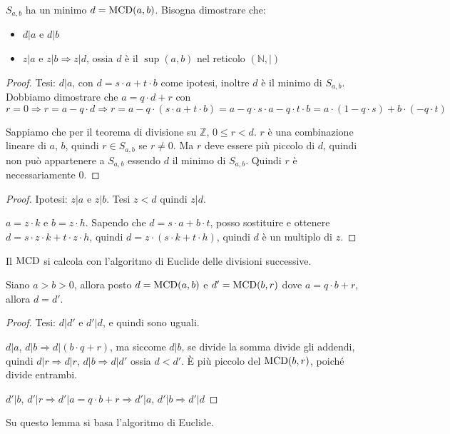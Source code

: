 $S_{a,b}$ ha un minimo $d = \operatorname{MCD}(a,b)$. Bisogna dimostrare che:
\begin{itemize}
    \item $d | a$ e $d | b$
    \item $z | a$ e $z | b \Rightarrow z | d$, ossia $d$ \`e il $\sup(a,b)$ nel reticolo $(\mathbb{N}, |)$
\end{itemize}
\begin{proof}
Tesi: $d | a$, con $d = s \cdot a + t \cdot b$ come ipotesi, inoltre $d$ \`e il minimo di $S_{a,b}$. Dobbiamo dimostrare che $a = q \cdot d + r$ con $r = 0 \Rightarrow r = a - q \cdot d \Rightarrow r = a - q \cdot (s \cdot a + t \cdot b) = a - q \cdot s \cdot a - q \cdot t \cdot b = a \cdot (1 - q \cdot s) + b \cdot (- q \cdot t)$

Sappiamo che per il teorema di divisione su $\mathbb{Z}$, $0 \le r < d$. $r$ \`e una combinazione lineare di $a$, $b$, quindi $r \in S_{a,b}$ se $r \neq 0$. Ma $r$ deve essere pi\`u piccolo di $d$, quindi non pu\`o appartenere a $S_{a,b}$ essendo $d$ il minimo di $S_{a,b}$. Quindi $r$ \`e necessariamente 0.
\end{proof}
\begin{proof}
Ipotesi: $z | a$ e $z | b$. Tesi $z < d$ quindi $z | d$.

$a = z \cdot k$ e $b = z \cdot h$. Sapendo che $d = s \cdot a + b \cdot t$, posso sostituire e ottenere $d = s \cdot z \cdot k + t \cdot z \cdot h$, quindi $d = z \cdot ( s \cdot k + t \cdot h)$, quindi $d$ \`e un multiplo di $z$.
\end{proof}

Il $\operatorname{MCD}$ si calcola con l'algoritmo di Euclide delle divisioni successive.

\begin{lem}
Siano $a > b > 0$, allora posto $d = \operatorname{MCD}(a,b)$ e $d' = \operatorname{MCD}(b, r)$ dove $a = q \cdot b + r$, allora $d = d'$.
\end{lem}
\begin{proof}
Tesi: $d | d'$ e $d' | d$, e quindi sono uguali.

$d | a$, $d | b \Rightarrow d | ( b \cdot q + r )$, ma siccome $d | b$, se divide la somma divide gli addendi, quindi $d | r \Rightarrow d | r$, $d | b \Rightarrow d | d'$ ossia $d < d'$. \`E pi\`u piccolo del $\operatorname{MCD}(b, r)$, poich\'e divide entrambi.

$d' | b$, $d' | r \Rightarrow d' | a = q \cdot b + r \Rightarrow d' | a$, $d' | b \Rightarrow d' | d$
\end{proof}
Su questo lemma si basa l'algoritmo di Euclide.

